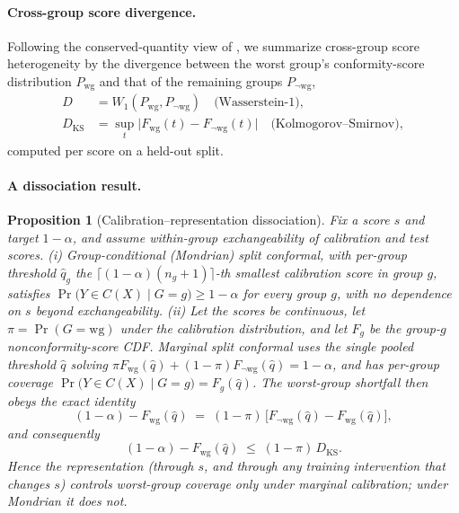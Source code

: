 \documentclass[pdflatex,sn-basic]{sn-jnl}%
\theoremstyle{thmstyleone}%
\newtheorem{proposition}[theorem]{Proposition}%
\newcommand{\wg}{\mathrm{wg}}
\newcommand{\Wone}{W_1}
\begin{document}
\paragraph{Cross-group score divergence.} Following the
conserved-quantity view of \citet{burden2026}, we summarize cross-group score
heterogeneity by the divergence between the worst group's conformity-score
distribution $P_{\wg}$ and that of the remaining groups $P_{\neg\wg}$,
\begin{equation}
\begin{aligned}
D &= \Wone(P_{\wg},P_{\neg\wg}) \quad\text{(Wasserstein-1)}, \\
D_{\mathrm{KS}} &= \sup_t\big|F_{\wg}(t)-F_{\neg\wg}(t)\big| \quad\text{(Kolmogorov--Smirnov)},
\end{aligned}
\label{eq:div}
\end{equation}
computed per score on a held-out split.

\paragraph{A dissociation result.}

\begin{proposition}[Calibration--representation dissociation]
\label{prop:dissociation}
Fix a score $s$ and target $1-\alpha$, and assume within-group exchangeability of
calibration and test scores.
\emph{(i)} Group-conditional (Mondrian) split conformal, with per-group threshold
$\hat q_g$ the $\lceil(1-\alpha)(n_g+1)\rceil$-th smallest calibration score in
group $g$, satisfies $\Pr\!\big(Y\in C(X)\mid G=g\big)\ge 1-\alpha$ for every group
$g$, with no dependence on $s$ beyond exchangeability.
\emph{(ii)} Let the scores be continuous, let $\pi=\Pr(G=\wg)$ under the calibration
distribution, and let $F_g$ be the group-$g$ nonconformity-score CDF. Marginal split
conformal uses the single pooled threshold $\hat q$ solving
$\pi F_{\wg}(\hat q)+(1-\pi)F_{\neg\wg}(\hat q)=1-\alpha$, and has per-group coverage
$\Pr\!\big(Y\in C(X)\mid G=g\big)=F_g(\hat q)$. The worst-group shortfall then obeys
the exact identity
\begin{equation}
(1-\alpha)-F_{\wg}(\hat q)\;=\;(1-\pi)\,\big[F_{\neg\wg}(\hat q)-F_{\wg}(\hat q)\big],
\label{eq:shortfall}
\end{equation}
and consequently
\begin{equation}
(1-\alpha)-F_{\wg}(\hat q)\;\le\;(1-\pi)\,D_{\mathrm{KS}}.
\label{eq:ksbound}
\end{equation}
Hence the representation (through $s$, and through any training intervention that
changes $s$) controls worst-group coverage \emph{only} under marginal calibration;
under Mondrian it does not. \end{proposition}
\end{document}
